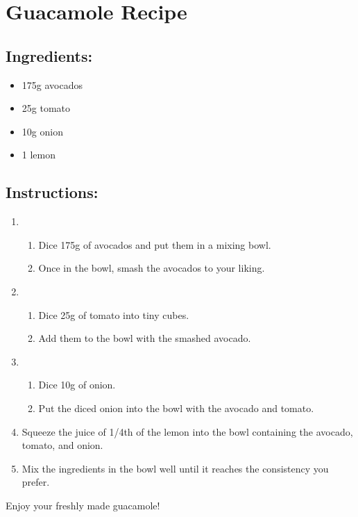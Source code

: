 \documentclass{article}
\begin{document}
\section*{Guacamole Recipe}

\subsection*{Ingredients:}

\begin{itemize}[noitemsep] 
    \item 175g avocados
    \item 25g tomato
    \item 10g onion
    \item 1 lemon
\end{itemize}

\subsection*{Instructions:}

\begin{enumerate}[noitemsep]
    \item 
        \begin{enumerate}[noitemsep]
            \item Dice 175g of avocados and put them in a mixing bowl.
            \item Once in the bowl, smash the avocados to your liking.
        \end{enumerate}
    \item
        \begin{enumerate}[noitemsep]
            \item Dice 25g of tomato into tiny cubes.
            \item Add them to the bowl with the smashed avocado.
        \end{enumerate}
    \item 
        \begin{enumerate}[noitemsep]
            \item Dice 10g of onion.
            \item Put the diced onion into the bowl with the avocado and tomato.
        \end{enumerate}
    \item Squeeze the juice of 1/4th of the lemon into the bowl containing the avocado, tomato, and onion.
    \item Mix the ingredients in the bowl well until it reaches the consistency you prefer.
\end{enumerate}

Enjoy your freshly made guacamole!
\end{document}
